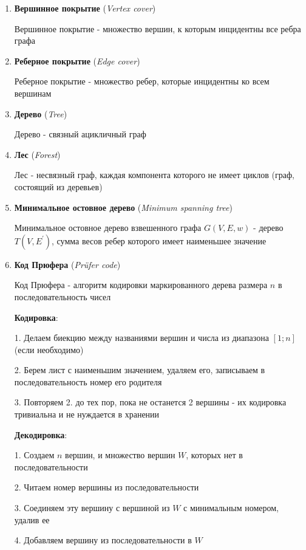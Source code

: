 \documentclass[12pt]{article}
\begin{document}
\begin{enumerate}
        \item \textbf{Вершинное покрытие} (\textit{Vertex cover})

        Вершинное покрытие - множество вершин, к которым инцидентны все ребра графа

        \item \textbf{Реберное покрытие} (\textit{Edge cover})

        Реберное покрытие - множество ребер, которые инцидентны ко всем вершинам

        \item \textbf{Дерево} (\textit{Tree})

        Дерево - связный ацикличный граф

        \item \textbf{Лес} (\textit{Forest})

        Лес - несвязный граф, каждая компонента которого не имеет циклов (граф, состоящий из деревьев)

        \item \textbf{Минимальное остовное дерево} (\textit{Minimum spanning tree})

        Минимальное остовное дерево взвешенного графа $G(V, E, w)$ - дерево $T(V, E^\prime)$, сумма весов ребер которого имеет наименьшее значение

        \item \textbf{Код Прюфера} (\textit{Prüfer code})

        Код Прюфера - алгоритм кодировки маркированного дерева размера $n$ в последовательность чисел

        \textbf{Кодировка}:

        1. Делаем биекцию между названиями вершин и числа из диапазона $[1;n]$ (если необходимо)

        2. Берем лист с наименьшим значением, удаляем его, записываем в последовательность номер его родителя

        3. Повторяем 2. до тех пор, пока не останется 2 вершины - их кодировка тривиальна и не нуждается в хранении

        \textbf{Декодировка}:

        1. Создаем $n$ вершин, и множество вершин $W$, которых нет в последовательности

        2. Читаем номер вершины из последовательности

        3. Соединяем эту вершину с вершиной из $W$ с минимальным номером, удалив ее

        4. Добавляем вершину из последовательности в $W$


\end{enumerate}
\end{document}
